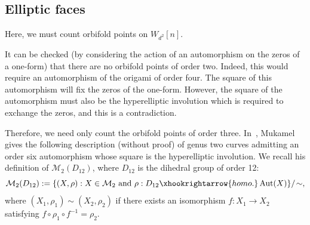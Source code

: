 \documentclass[a4paper,11pt]{amsart}
\numberwithin{equation}{section}
\numberwithin{figure}{section}
\numberwithin{table}{section}
\DeclareMathOperator{\Aut}{{\rm{Aut}}}
\begin{document}

\subsection{Elliptic faces}

Here, we must count orbifold points on $W_{d^2}[n]$.

It can be checked (by considering the action of an automorphism on the zeros of a one-form) that there are no orbifold points of order two. Indeed, this would require an automorphism of the origami of order four. The square of this automorphism will fix the zeros of the one-form. However, the square of the automorphism must also be the hyperelliptic involution which is required to exchange the zeros, and this is a contradiction.

Therefore, we need only count the orbifold points of order three. In~\cite[Appendix A]{Muk}, Mukamel gives the following description (without proof) of genus two curves admitting an order six automorphism whose square is the hyperelliptic involution. We recall his definition of $\mathcal{M}_{2}(D_{12})$, where $D_{12}$ is the dihedral group of order 12:
\[\mathcal{M}_{2}(D_{12}) := \{(X,\rho):X\in\mathcal{M}_{2}\text{ and }\rho:D_{12}\xhookrightarrow{homo.}\Aut(X)\}/\!\sim,\]
where $(X_{1},\rho_{1})\sim(X_{2},\rho_{2})$ if there exists an isomorphism $f:X_{1}\to X_{2}$ satisfying $f\circ\rho_{1}\circ f^{-1} = \rho_{2}$.
\end{document}
